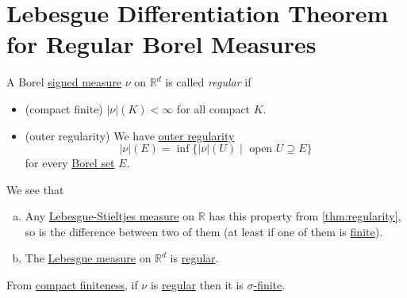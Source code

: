 \section{Lebesgue Differentiation Theorem for Regular Borel Measures}
\begin{definition}[Regular]\label{def:regular}
	A Borel \hyperref[def:signed-measure]{signed measure} \(\nu\) on \(\mathbb{R}^d\) is called \emph{regular} if
	\begin{itemize}
		\item\label{def:regular-compact-finite} (compact finite) \(\left\vert \nu \right\vert(K) < \infty\) for all compact \(K\).
		\item\label{def:regular-outer-regularity} (outer regularity) We have \hyperref[thm:regularity]{outer regularity}
		      \[
			      \left\vert \nu \right\vert(E) = \inf\{\left\vert \nu \right\vert(U) \mid \text{ open } U \supseteq E\}
		      \]
		      for every \hyperref[def:Borel-set]{Borel set} \(E\).
	\end{itemize}
\end{definition}

\begin{eg}
	We see that
	\begin{enumerate}[(a)]
		\item Any \hyperref[def:Lebesgue-Stieltjes-measure]{Lebesgue-Stieltjes measure} on \(\mathbb{R}\) has this property from \autoref{thm:regularity},
		      so is the difference between two of them (at least if one of them is \hyperref[def:finite-signed-measure]{finite}).
		\item The \hyperref[def:Lebesgue-measure]{Lebesgue measure} on \(\mathbb{R}^d\) is \hyperref[def:regular]{regular}.
	\end{enumerate}
\end{eg}

\begin{note}
	From \hyperref[def:regular-compact-finite]{compact finiteness}, if \(\nu\) is \hyperref[def:regular]{regular} then it is
	\hyperref[def:finite-signed-measure]{\(\sigma\)-finite}.
\end{note}

